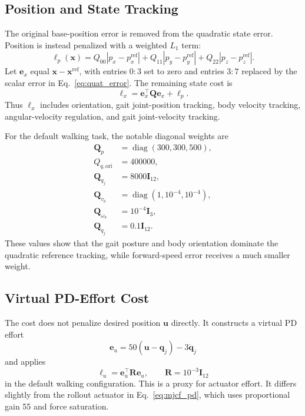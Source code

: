 \documentclass[11pt,a4paper]{article}
\newcommand{\diag}{\operatorname{diag}}
\begin{document}
\subsection{Position and State Tracking}

The original base-position error is removed from the quadratic state error.
Position is instead penalized with a weighted $L_1$ term:
\begin{equation}
  \ell_p(\bm{x})=
  Q_{00}|p_x-p_x^{\mathrm{ref}}|
  +Q_{11}|p_y-p_y^{\mathrm{ref}}|
  +Q_{22}|p_z-p_z^{\mathrm{ref}}|.
  \label{eq:position_cost}
\end{equation}
Let $\bm{e}_x$ equal $\bm{x}-\bm{x}^{\mathrm{ref}}$, with entries
$0{:}3$ set to zero and entries $3{:}7$ replaced by the scalar error in
Eq.~\eqref{eq:quat_error}.  The remaining state cost is
\begin{equation}
  \ell_x=\bm{e}_x^\top\bm{Q}\bm{e}_x+\ell_p.
  \label{eq:state_cost}
\end{equation}
Thus $\ell_x$ includes orientation, gait joint-position tracking, body
velocity tracking, angular-velocity regulation, and gait joint-velocity
tracking.

For the default walking task, the notable diagonal weights are
\begin{equation}
\begin{split}
  \bm{Q}_p &= \diag(300,300,500),\\
  Q_{q,\mathrm{ori}} &=400000,\\
  \bm{Q}_{q_j}&=8000\bm{I}_{12},\\
  \bm{Q}_{v_b}&=\diag(1,10^{-4},10^{-4}),\\
  \bm{Q}_{\omega_b}&=10^{-4}\bm{I}_3,\\
  \bm{Q}_{\dot q_j}&=0.1\bm{I}_{12}.
\end{split}
\end{equation}
These values show that the gait posture and body orientation dominate the
quadratic reference tracking, while forward-speed error receives a much
smaller weight.

\subsection{Virtual PD-Effort Cost}

The cost does not penalize desired position $\bm{u}$ directly.  It constructs
a virtual PD effort
\begin{equation}
  \bm{e}_u=50(\bm{u}-\bm{q}_j)-3\dot{\bm{q}}_j
  \label{eq:virtual_effort}
\end{equation}
and applies
\begin{equation}
  \ell_u=\bm{e}_u^\top\bm{R}\bm{e}_u,
  \qquad \bm{R}=10^{-3}\bm{I}_{12}
\end{equation}
in the default walking configuration.  This is a proxy for actuator effort.
It differs slightly from the rollout actuator in Eq.~\eqref{eq:mjcf_pd},
which uses proportional gain 55 and force saturation.
\end{document}
